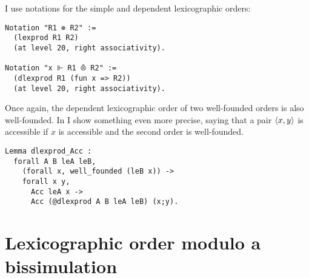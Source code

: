I use notations for the simple and dependent lexicographic orders:
\begin{verbatim}
Notation "R1 ⊗ R2" :=
  (lexprod R1 R2)
  (at level 20, right associativity).

Notation "x ⊩ R1 ⨶ R2" :=
  (dlexprod R1 (fun x => R2))
  (at level 20, right associativity).
\end{verbatim}

Once again, the dependent lexicographic order of two well-founded orders is also
well-founded. In \Coq I show something even more precise, saying that a pair
\(\langle x,y \rangle\) is accessible if \(x\) is accessible and the second order is
well-founded.
\begin{verbatim}
Lemma dlexprod_Acc :
  forall A B leA leB,
    (forall x, well_founded (leB x)) ->
    forall x y,
      Acc leA x ->
      Acc (@dlexprod A B leA leB) (x;y).
\end{verbatim}

\section{Lexicographic order modulo a bissimulation}